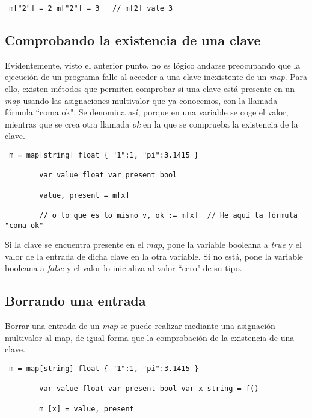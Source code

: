 	\begin{verbatim} m["2"] = 2 m["2"] = 3   // m[2] vale 3 \end{verbatim}
	
	\subsection{Comprobando la existencia de una clave}
	
	Evidentemente, visto el anterior punto, no es lógico andarse preocupando que
	la ejecución de un programa falle al acceder a una clave inexistente de un
	\textit{map}. Para ello, existen métodos que permiten comprobar si una clave
	está presente en un \textit{map} usando las asignaciones multivalor que ya
	conocemos, con la llamada fórmula ``coma ok". Se denomina así, porque en una
	variable se coge el valor, mientras que se crea otra llamada \textit{ok} en
	la que se comprueba la existencia de la clave.
	
	\begin{verbatim} m = map[string] float { "1":1, "pi":3.1415 }
	    
		var value float var present bool
	    
		value, present = m[x]
	    
		// o lo que es lo mismo v, ok := m[x]  // He aquí la fórmula "coma ok"
		\end{verbatim}
	
	Si la clave se encuentra presente en el \textit{map}, pone la variable
	booleana a \textit{true} y el valor de la entrada de dicha clave en la otra
	variable. Si no está, pone la variable booleana a \textit{false} y el valor
	lo inicializa al valor ``cero" de su tipo.
	
	\subsection{Borrando una entrada}
	
	Borrar una entrada de un \textit{map} se puede realizar mediante una
	asignación multivalor al map, de igual forma que la comprobación de la
	existencia de una clave.
	
	\begin{verbatim} m = map[string] float { "1":1, "pi":3.1415 }
	    
		var value float var present bool var x string = f()
	    
		m [x] = value, present \end{verbatim}
	
